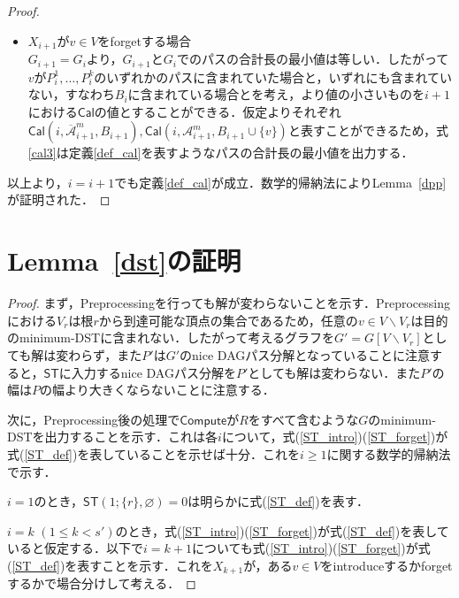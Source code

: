 \documentclass[master]{kuisthesis}		%
\theoremstyle{plain}
\theoremstyle{definition}
\begin{document}
{\begin{proof}
\begin{itemize}
        \item $X_{i+1}$が$v \in V$をforgetする場合 \\
        $G_{i+1} = G_i$より，$G_{i+1}$と$G_i$でのパスの合計長の最小値は等しい．したがって$v$が$P^1_i, \dots , P^k_i$のいずれかのパスに含まれていた場合と，いずれにも含まれていない，すなわち$B_i$に含まれている場合とを考え，より値の小さいものを$i+1$における$\mathsf{Cal}$の値とすることができる．仮定よりそれぞれ$\mathsf{Cal}(i, \mathscr{\overline{A}}^m_{i+1}, B_{i+1}),\mathsf{Cal}(i, \mathscr{A}^m_{i+1}, B_{i+1} \cup \{v\})$と表すことができるため，式\ref{cal3}は定義\ref{def_cal}を表すようなパスの合計長の最小値を出力する．
    \end{itemize}
    以上より，$i = i+1$でも定義\ref{def_cal}が成立．数学的帰納法によりLemma~\ref{dpp}が証明された．
\end{proof}







\section{Lemma~\ref{dst}の証明}

\begin{proof}
    まず，Preprocessingを行っても解が変わらないことを示す．Preprocessingにおける$V_r$は根$r$から到達可能な頂点の集合であるため，任意の$v \in V \backslash V_r$は目的のminimum-DSTに含まれない．したがって考えるグラフを$G' = G[V \backslash V_r]$としても解は変わらず，また$P'$は$G'$のnice DAGパス分解となっていることに注意すると，$\mathsf{ST}$に入力するnice DAGパス分解を$P'$としても解は変わらない．また$P'$の幅は$P$の幅より大きくならないことに注意する．

    次に，Preprocessing後の処理で$\mathsf{Compute}$が$R$をすべて含むような$G$のminimum-DSTを出力することを示す．これは各$i$について，式(\ref{ST_intro})(\ref{ST_forget})が式(\ref{ST_def})を表していることを示せば十分．これを$i \geq 1$に関する数学的帰納法で示す．    
 
    
    $i=1$のとき，$\mathsf{ST}(1; \{r\}, \varnothing) = 0$は明らかに式(\ref{ST_def})を表す．
    
    $i=k$ $(1 \leq k < s')$のとき，式(\ref{ST_intro})(\ref{ST_forget})が式(\ref{ST_def})を表していると仮定する．以下で$i = k+1$についても式(\ref{ST_intro})(\ref{ST_forget})が式(\ref{ST_def})を表すことを示す．これを$X_{k+1}$が，ある$v \in V$をintroduceするかforgetするかで場合分けして考える．


\end{proof}}
\end{document}
